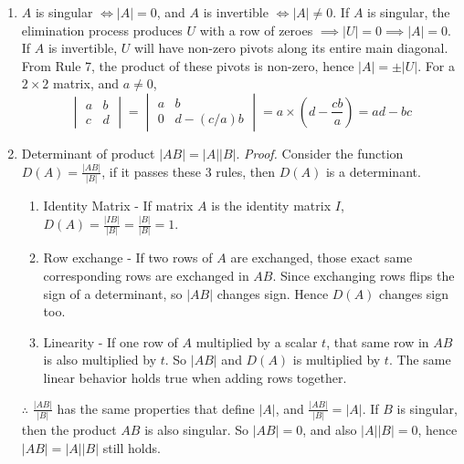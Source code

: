 \documentclass[../linear-algebra.tex]{subfiles}
\begin{document}
\begin{enumerate}
    \item $A$ is singular $\iff |A| = 0$, and $A$ is invertible $\iff |A| \neq 0$.\newline
    If $A$ is singular, the elimination process produces $U$ with a row of zeroes $\implies |U| = 0 \implies |A| = 0$.\newline
    If $A$ is invertible, $U$ will have non-zero pivots along its entire main diagonal.
    From Rule 7, the product of these pivots is non-zero, hence $|A| = \pm |U|$.\newline
    For a $2 \times 2$ matrix, and $a \neq 0$,
    \[\begin{vmatrix} a & b \\ c & d \end{vmatrix} = \begin{vmatrix} a & b \\ 0 & d - (c/a)b \end{vmatrix} = a \times \left(d - \frac{cb}{a}\right) = ad - bc\]

    \item Determinant of product $|AB| = |A||B|$.\newline
    \textit{Proof.}
    Consider the function $D(A) = \frac{|AB|}{|B|}$, if it passes these 3 rules, then $D(A)$ is a determinant.
    \begin{enumerate}
        \item Identity Matrix - If matrix $A$ is the identity matrix $I$, $D(A) = \frac{|IB|}{|B|} = \frac{|B|}{|B|} = 1$.
        \item Row exchange - If two rows of $A$ are exchanged, those exact same corresponding rows are exchanged in $AB$.
        Since exchanging rows flips the sign of a determinant, so $|AB|$ changes sign. Hence $D(A)$ changes sign too.
        \item Linearity - If one row of $A$ multiplied by a scalar $t$, that same row in $AB$ is also multiplied by $t$.
        So $|AB|$ and $D(A)$ is multiplied by $t$. The same linear behavior holds true when adding rows together.
    \end{enumerate}
    $\therefore$ $\frac{|AB|}{|B|}$ has the same properties that define $|A|$, and $\frac{|AB|}{|B|} = |A|$.\newline
    If $B$ is singular, then the product $AB$ is also singular. So $|AB| = 0$, and also $|A||B| = 0$, hence $|AB| = |A||B|$ still holds.


\end{enumerate}
\end{document}
